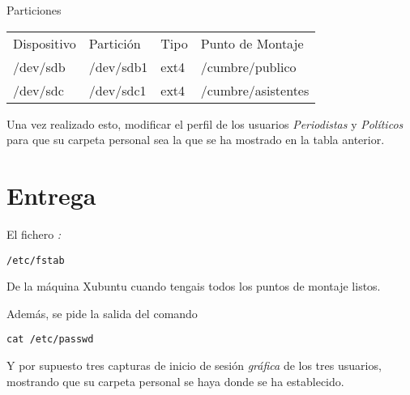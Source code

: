 \documentclass[11pt]{article}
\begin{document}
Particiones

\begin{center}
\begin{tabular}{llll}
Dispositivo & Partición & Tipo & Punto de Montaje\\
/dev/sdb & /dev/sdb1 & ext4 & /cumbre/publico\\
/dev/sdc & /dev/sdc1 & ext4 & /cumbre/asistentes\\
\end{tabular}
\end{center}

Una vez realizado esto, modificar el perfil de los usuarios \emph{Periodistas} y
\emph{Políticos} para que su carpeta personal sea la que se ha mostrado en la tabla
anterior.

\section{Entrega}
\label{sec-4}

El fichero \emph{:}

\begin{verbatim}
/etc/fstab
\end{verbatim}

De la máquina Xubuntu cuando tengais todos los puntos de montaje listos.

Además, se pide la salida del comando 

\begin{verbatim}
cat /etc/passwd
\end{verbatim}

Y por supuesto tres capturas de inicio de sesión \emph{gráfica} de los tres usuarios,
mostrando que su carpeta personal se haya donde se ha establecido.
\end{document}

